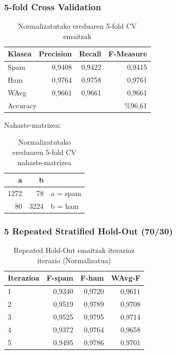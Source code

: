 \documentclass[12pt, a4paper]{article}
\begin{document}
\subsubsection*{5-fold Cross Validation}

\begin{table}[H]
    \centering
    \caption{Normalizatutako ereduaren 5-fold CV emaitzak}
    \begin{tabular}{lrrr}
        \toprule
        \textbf{Klasea} & \textbf{Precision} & \textbf{Recall} & \textbf{F-Measure} \\
        \midrule
        Spam  & 0,9408 & 0,9422 & 0,9415 \\
        Ham   & 0,9764 & 0,9758 & 0,9761 \\
        WAvg  & 0,9661 & 0,9661 & 0,9661 \\
        \midrule
        \multicolumn{2}{l}{Accuracy} & \multicolumn{2}{r}{\%96,61} \\
        \bottomrule
    \end{tabular}
\end{table}

Nahaste-matrizea:

\begin{table}[H]
    \centering
    \caption{Normalizatutako ereduaren 5-fold CV nahaste-matrizea}
    \begin{tabular}{rr|l}
        \toprule
        \textbf{a} & \textbf{b} & \\
        \midrule
        1272 & 78  & a = spam \\
        80   & 3224 & b = ham  \\
        \bottomrule
    \end{tabular}
\end{table}

\subsubsection*{5 Repeated Stratified Hold-Out (70/30)}

\begin{table}[H]
    \centering
    \caption{Repeated Hold-Out emaitzak iterazioz iterazio (Normalizatua)}
    \begin{tabular}{lrrr}
        \toprule
        \textbf{Iterazioa} & \textbf{F-spam} & \textbf{F-ham} & \textbf{WAvg-F} \\
        \midrule
        1 & 0,9340 & 0,9720 & 0,9611 \\
        2 & 0,9519 & 0,9789 & 0,9708 \\
        3 & 0,9525 & 0,9795 & 0,9714 \\
        4 & 0,9372 & 0,9764 & 0,9658 \\
        5 & 0,9495 & 0,9786 & 0,9701 \\
        \bottomrule
    \end{tabular}
\end{table}
\end{document}
